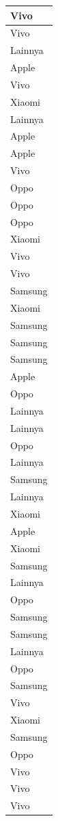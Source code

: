 \documentclass[
  letterpaper,
  DIV=11,
  numbers=noendperiod]{scrartcl}
\begin{document}
\begin{table}
\begin{tabular}[t]{l}
\hline
Vivo\\
\hline
Vivo\\
\hline
Lainnya\\
\hline
Apple\\
\hline
Vivo\\
\hline
Xiaomi\\
\hline
Lainnya\\
\hline
Apple\\
\hline
Apple\\
\hline
Vivo\\
\hline
Oppo\\
\hline
Oppo\\
\hline
Oppo\\
\hline
Xiaomi\\
\hline
Vivo\\
\hline
Vivo\\
\hline
Samsung\\
\hline
Xiaomi\\
\hline
Samsung\\
\hline
Samsung\\
\hline
Samsung\\
\hline
Apple\\
\hline
Oppo\\
\hline
Lainnya\\
\hline
Lainnya\\
\hline
Oppo\\
\hline
Lainnya\\
\hline
Samsung\\
\hline
Lainnya\\
\hline
Xiaomi\\
\hline
Apple\\
\hline
Xiaomi\\
\hline
Samsung\\
\hline
Lainnya\\
\hline
Oppo\\
\hline
Samsung\\
\hline
Samsung\\
\hline
Lainnya\\
\hline
Oppo\\
\hline
Samsung\\
\hline
Vivo\\
\hline
Xiaomi\\
\hline
Samsung\\
\hline
Oppo\\
\hline
Vivo\\
\hline
Vivo\\
\hline
Vivo\\

\end{tabular}
\end{table}
\end{document}
